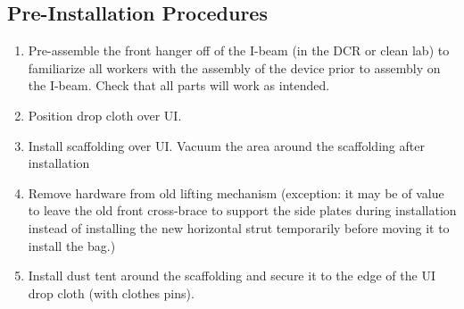 \documentclass[11pt]{article}
\begin{document}
\subsection{Pre-Installation Procedures}
\begin{enumerate}
\item Pre-assemble the front hanger off of the I-beam (in the DCR or clean lab) to familiarize all workers with the assembly of the device prior to assembly on the I-beam. Check that all parts will work as intended. 
\item Position drop cloth over UI.
\item Install scaffolding over UI. Vacuum the area around the scaffolding after installation
\item Remove hardware from old lifting mechanism (exception: it may be of value to leave the old front cross-brace to support the side plates during installation instead of installing the new horizontal strut temporarily before moving it to install the bag.)
\item Install dust tent around the scaffolding and secure it to the edge of the UI drop cloth (with clothes pins).
\end{enumerate}
\end{document}
